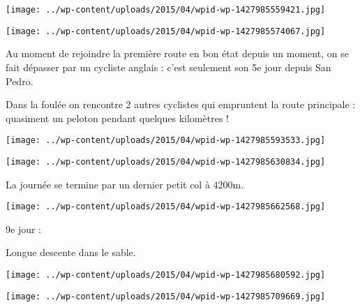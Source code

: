 \begin{center} \texttt{[image: ../wp-content/uploads/2015/04/wpid-wp-1427985559421.jpg]} \end{center}



 

\begin{center} \texttt{[image: ../wp-content/uploads/2015/04/wpid-wp-1427985574067.jpg]} \end{center}



 Au moment de rejoindre la première route en bon état depuis un moment, on se fait dépasser par un cycliste anglais : c'est seulement son 5e jour depuis San Pedro. 

 Dans la foulée on rencontre 2 autres cyclistes qui empruntent la route principale : quasiment un peloton pendant quelques kilomètres !

 

\begin{center} \texttt{[image: ../wp-content/uploads/2015/04/wpid-wp-1427985593533.jpg]} \end{center}



 

\begin{center} \texttt{[image: ../wp-content/uploads/2015/04/wpid-wp-1427985630834.jpg]} \end{center}



 La journée se termine par un dernier petit col à 4200m.

 

\begin{center} \texttt{[image: ../wp-content/uploads/2015/04/wpid-wp-1427985662568.jpg]} \end{center}



 9e jour : 

 Longue descente dans le sable.

 

\begin{center} \texttt{[image: ../wp-content/uploads/2015/04/wpid-wp-1427985680592.jpg]} \end{center}



 

\begin{center} \texttt{[image: ../wp-content/uploads/2015/04/wpid-wp-1427985709669.jpg]} \end{center}



